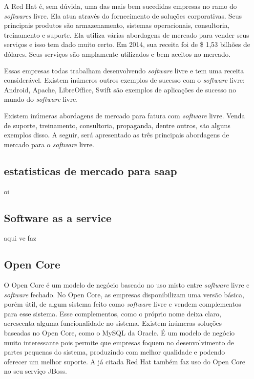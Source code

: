 \documentclass{classe_cn}                 %
\begin{document}
A Red Hat é, sem dúvida, uma das mais bem sucedidas empresas no ramo do \textit{softwares} livre. Ela atua através do fornecimento de soluções corporativas. Seus principais produtos são armazenamento, sistemas operacionais, consultoria, treinamento e suporte. Ela utiliza várias abordagens de mercado para vender seus serviços e isso tem dado muito certo. Em 2014, sua receita foi de \$ 1,53 bilhões de dólares. Seus serviços são amplamente utilizados e bem aceitos no mercado.

Essas empresas todas trabalham desenvolvendo \textit{software} livre e tem uma receita considerável. Existem inúmeros outros exemplos de sucesso com o \textit{software} livre: Android, Apache, LibreOffice, Swift são exemplos de aplicações de sucesso no mundo do \textit{software} livre. 

Existem inúmeras abordagens de mercado para fatura com \textit{software} livre. Venda de suporte, treinamento, consultoria, propaganda, dentre outros, são alguns exemplos disso. A seguir, será apresentado as três principais abordagens de mercado para o \textit{software} livre.

\subsection{estatisticas de mercado para saap}
oi


\subsection{Software as a service}

aqui vc faz

\subsection{Open Core}

O Open Core é um modelo de negócio baseado no uso misto entre \textit{software} livre e \textit{software} fechado. No Open Core, as empresas disponibilizam uma versão básica, porém útil, de algum sistema feito como \textit{software} livre e vendem complementos para esse sistema. Esse complementos, como o próprio nome deixa claro, acrescenta alguma funcionalidade no sistema. Existem inúmeras soluções baseadas no Open Core, como o MySQL da Oracle. É um modelo de negócio muito interessante pois permite que empresas foquem no desenvolvimento de partes pequenas do sistema, produzindo com melhor qualidade e podendo oferecer um melhor suporte.
A já citada Red Hat também faz uso do Open Core no seu serviço JBoss. 
\end{document}
